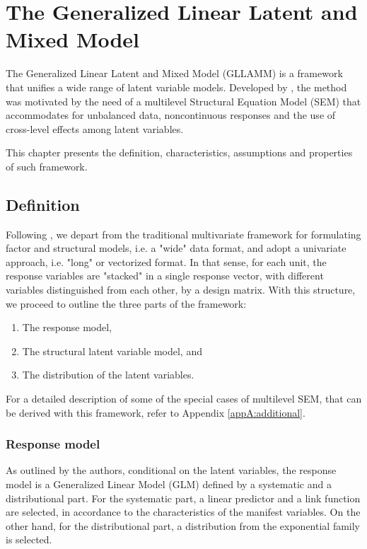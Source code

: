 \chapter{The Generalized Linear Latent and Mixed Model} \label{chap:framework}

The Generalized Linear Latent and Mixed Model (GLLAMM) is a framework that unifies a wide range of latent variable models. Developed by \citet{Rabe_et_al_2004a, Rabe_et_al_2004b, Rabe_et_al_2004c, Skrondal_et_al_2004a, Rabe_et_al_2012}, the method was motivated by the need of a multilevel Structural Equation Model (SEM) that accommodates for unbalanced data, noncontinuous responses and the use of cross-level effects among latent variables. 

This chapter presents the definition, characteristics, assumptions and properties of such framework.


\section{Definition}
Following \citet{Rabe_et_al_2004a, Rabe_et_al_2012}, we depart from the traditional multivariate framework for formulating factor and structural models, i.e. a "wide" data format, and adopt a univariate approach, i.e. "long" or vectorized format. In that sense, for each unit, the response variables are "stacked" in a single response vector, with different variables distinguished from each other, by a design matrix. With this structure, we proceed to outline the three parts of the framework: 
\begin{enumerate}
	\item The response model, 
	\item The structural latent variable model, and 
	\item The distribution of the latent variables. 
\end{enumerate}
For a detailed description of some of the special cases of multilevel SEM, that can be derived with this framework, refer to Appendix \ref{appA:additional}.


\subsection{Response model}
As outlined by the authors, conditional on the latent variables, the response model is a Generalized Linear Model (GLM) defined by a systematic and a distributional part. For the systematic part, a linear predictor and a link function are selected, in accordance to the characteristics of the manifest variables. On the other hand, for the distributional part, a distribution from the exponential family is selected. \\

